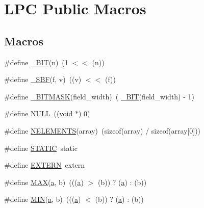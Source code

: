 \hypertarget{group__LPC__Types__Public__Macros}{\section{L\-P\-C Public Macros}
\label{group__LPC__Types__Public__Macros}
}
\subsection*{Macros}
\begin{DoxyCompactItemize}
\item 
\#define \hyperlink{group__LPC__Types__Public__Macros_ga7ee022f5e5a971a8324e4b7572d49170}{\-\_\-\-B\-I\-T}(n)~(1 $<$$<$ (n))
\item 
\#define \hyperlink{group__LPC__Types__Public__Macros_ga6caca3483c2ce446900be05ea02e8f49}{\-\_\-\-S\-B\-F}(f, v)~((v) $<$$<$ (f))
\item 
\#define \hyperlink{group__LPC__Types__Public__Macros_ga78ad3421dde54769e8b46d36819ae87a}{\-\_\-\-B\-I\-T\-M\-A\-S\-K}(field\-\_\-width)~( \hyperlink{group__LPC__Types__Public__Macros_ga7ee022f5e5a971a8324e4b7572d49170}{\-\_\-\-B\-I\-T}(field\-\_\-width) -\/ 1)
\item 
\#define \hyperlink{group__LPC__Types__Public__Macros_ga070d2ce7b6bb7e5c05602aa8c308d0c4}{N\-U\-L\-L}~((\hyperlink{Paradigm_2Tern__EE_2small_2portmacro_8h_a14d32f8130d3c0b212cfc751730b5b49}{void} $\ast$) 0)
\item 
\#define \hyperlink{group__LPC__Types__Public__Macros_gafdd9296176e56fcfd83c07d345a045a7}{N\-E\-L\-E\-M\-E\-N\-T\-S}(array)~(sizeof(array) / sizeof(array\mbox{[}0\mbox{]}))
\item 
\#define \hyperlink{group__LPC__Types__Public__Macros_ga10b2d890d871e1489bb02b7e70d9bdfb}{S\-T\-A\-T\-I\-C}~static
\item 
\#define \hyperlink{group__LPC__Types__Public__Macros_ga77366c1bd428629dc898e188bfd182a3}{E\-X\-T\-E\-R\-N}~extern
\item 
\#define \hyperlink{group__LPC__Types__Public__Macros_gafa99ec4acc4ecb2dc3c2d05da15d0e3f}{M\-A\-X}(\hyperlink{CCS_2MSP430X_2data__model_8h_a79f1ee1a890da6b8d5ae0087f0a941b8}{a}, b)~(((\hyperlink{CCS_2MSP430X_2data__model_8h_a79f1ee1a890da6b8d5ae0087f0a941b8}{a}) $>$ (b)) ? (\hyperlink{CCS_2MSP430X_2data__model_8h_a79f1ee1a890da6b8d5ae0087f0a941b8}{a}) \-: (b))
\item 
\#define \hyperlink{group__LPC__Types__Public__Macros_ga3acffbd305ee72dcd4593c0d8af64a4f}{M\-I\-N}(\hyperlink{CCS_2MSP430X_2data__model_8h_a79f1ee1a890da6b8d5ae0087f0a941b8}{a}, b)~(((\hyperlink{CCS_2MSP430X_2data__model_8h_a79f1ee1a890da6b8d5ae0087f0a941b8}{a}) $<$ (b)) ? (\hyperlink{CCS_2MSP430X_2data__model_8h_a79f1ee1a890da6b8d5ae0087f0a941b8}{a}) \-: (b))
\end{DoxyCompactItemize}


